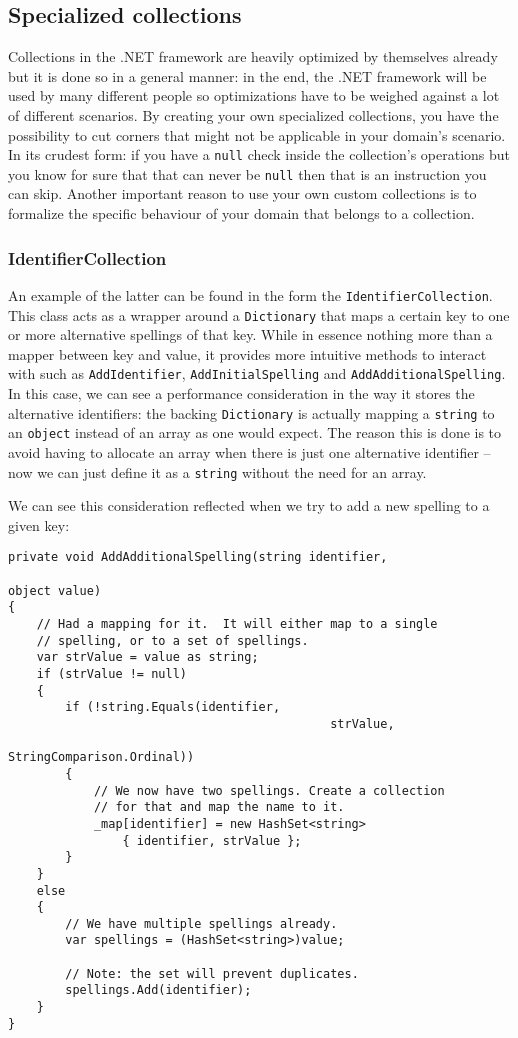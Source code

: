 \subsection{Specialized collections}
\label{sec:specialized-collections}

Collections in the .NET framework are heavily optimized by themselves already but it is done so in a general manner: in the end, the .NET framework will be used by many different people so optimizations have to be weighed against a lot of different scenarios. By creating your own specialized collections, you have the possibility to cut corners that might not be applicable in your domain's scenario. In its crudest form: if you have a \texttt{null} check inside the collection's operations but you know for sure that that can never be \texttt{null} then that is an instruction you can skip. Another important reason to use your own custom collections is to formalize the specific behaviour of your domain that belongs to a collection. 

\subsubsection{IdentifierCollection}
\label{sec:spec-coll-identifiercollection}

An example of the latter can be found in the form the \texttt{IdentifierCollection}. This class acts as a wrapper around a \texttt{Dictionary} that maps a certain key to one or more alternative spellings of that key. While in essence nothing more than a mapper between key and value, it provides more intuitive methods to interact with such as \texttt{AddIdentifier}, \texttt{AddInitialSpelling} and \texttt{AddAdditionalSpelling}.
In this case, we can see a performance consideration in the way it stores the alternative identifiers: the backing \texttt{Dictionary} is actually mapping a \texttt{string} to an \texttt{object} instead of an array as one would expect. The reason this is done is to avoid having to allocate an array when there is just one alternative identifier -- now we can just define it as a \texttt{string} without the need for an array.

We can see this consideration reflected when we try to add a new spelling to a given key:

\begin{lstlisting}
private void AddAdditionalSpelling(string identifier, 
																	 object value)
{
	// Had a mapping for it.  It will either map to a single 
	// spelling, or to a set of spellings.
	var strValue = value as string;
	if (strValue != null)
	{
		if (!string.Equals(identifier, 
											 strValue, 
											 StringComparison.Ordinal))
		{
			// We now have two spellings. Create a collection 
			// for that and map the name to it.
			_map[identifier] = new HashSet<string> 
				{ identifier, strValue };
		}
	}
	else
	{
		// We have multiple spellings already.
		var spellings = (HashSet<string>)value;

		// Note: the set will prevent duplicates.
		spellings.Add(identifier);
	}
}
\end{lstlisting}

